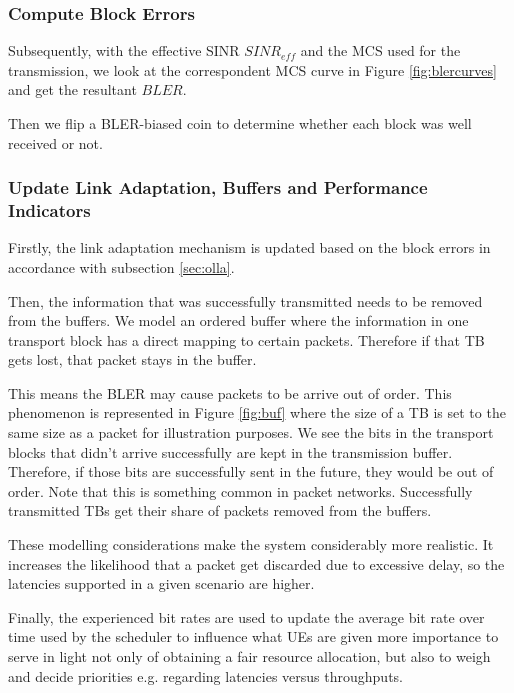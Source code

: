 \subsubsection*{Compute Block Errors}

Subsequently, with the effective SINR $SINR_{eff}$ and the MCS used for the transmission, we look at the correspondent MCS curve in Figure \ref{fig:blercurves} and get the resultant $BLER$.

Then we flip a \acs{BLER}-biased coin to determine whether each block was well received or not.


\subsubsection*{Update Link Adaptation, Buffers and Performance Indicators}

Firstly, the link adaptation mechanism is updated based on the block errors in accordance with subsection \ref{sec:olla}. 

Then, the information that was successfully transmitted needs to be removed from the buffers. We model an ordered buffer where the information in one transport block has a direct mapping to certain packets. Therefore if that TB gets lost, that packet stays in the buffer.

This means the BLER may cause packets to be arrive out of order. This phenomenon is represented in Figure \ref{fig:buf} where the size of a TB is set to the same size as a packet for illustration purposes. We see the bits in the transport blocks that didn't arrive successfully are kept in the transmission buffer. Therefore, if those bits are successfully sent in the future, they would be out of order. Note that this is something common in packet networks. Successfully transmitted TBs get their share of packets removed from the buffers.



These modelling considerations make the system considerably more realistic. It increases the likelihood that a packet get discarded due to excessive delay, so the latencies supported in a given scenario are higher.

Finally, the experienced bit rates are used to update the average bit rate over time used by the scheduler to influence what UEs are given more importance to serve in light not only of obtaining a fair resource allocation, but also to weigh and decide priorities e.g. regarding latencies versus throughputs.

